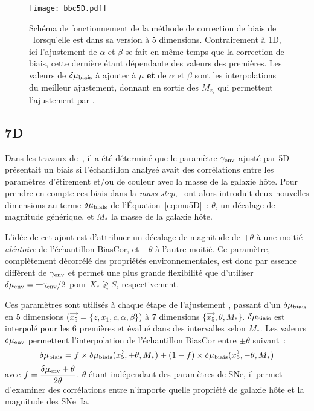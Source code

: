 \documentclass[../main/main.tex]{subfiles}
\begin{document}
\begin{figure}[]
    \centering
    \texttt{[image: bbc5D.pdf]}
    \caption[Schéma de fonctionnement de la méthode de correction de biais de
    \bbc5D]{Schéma de fonctionnement de la méthode de correction de biais de
        \bbc\ lorsqu'elle est dans sa version à 5 dimensions. Contrairement à
        \bbc1D, ici l'ajustement de $\alpha$ et $\beta$ se fait en même temps
        que la correction de biais, cette dernière étant dépendante des valeurs
        des premières. Les valeurs de $\delta\mu_{\rm biais}$ à ajouter à $\mu$
        \textbf{et} de $\alpha$ et $\beta$ sont les interpolations du meilleur
        ajustement, donnant en sortie des $M_{z_i}$ qui permettent l'ajustement
    par \wfit.}
    \label{fig:bbc5d}
\end{figure}

\subsection{\bbc7D}\label{ssec:bbc7D}

Dans les travaux de~\cite{smith2020}, il a été déterminé que le paramètre
$\gamma_{\rm env}$ ajusté par \bbc5D présentait un biais si l'échantillon
analysé avait des corrélations entre les paramètres d'étirement et/ou de couleur
avec la masse de la galaxie hôte. Pour prendre en compte ces biais dans la
\textit{mass step},~\cite{popovic2021a} ont alors introduit deux nouvelles
dimensions au terme $\delta\mu_{\rm biais}$ de l'Équation~\ref{eq:mu5D}~:
$\theta$, un décalage de magnitude générique, et $M_*$ la masse de la galaxie
hôte.

L'idée de cet ajout est d'attribuer un décalage de magnitude de $+\theta$ à une
moitié \textit{aléatoire} de l'échantillon BiasCor, et $-\theta$ à l'autre
moitié. Ce paramètre, complètement décorrélé des propriétés environnementales,
est donc par essence différent de $\gamma_{\rm env}$ et permet une plus grande
flexibilité que d'utiliser $\delta\mu_{\rm env} = \pm\gamma_{\rm env}/2$ pour
$X_* \gtrless S$, respectivement.

Ces paramètres sont utilisés à chaque étape de l'ajustement \bbc, passant d'un
$\delta\mu_{\rm biais}$ en 5 dimensions ($\overrightarrow{x_5} = \{z, x_1, c,
\alpha, \beta\}$) à 7 dimensions $\{\overrightarrow{x_5}, \theta, M_*\}$.
$\delta\mu_{\rm biais}$ est interpolé pour les 6 premières et évalué dans des
intervalles selon $M_*$. Les valeurs $\delta\mu_{\rm env}$ permettent
l'interpolation de l'échantillon BiasCor entre $\pm\theta$ suivant~:
\begin{equation}
    \delta\mu_{\rm biais} =
    f\times\delta\mu_{\rm biais}(\overrightarrow{x_5}, +\theta, M_*)
    + (1-f)\times\delta\mu_{\rm biais}(\overrightarrow{x_5}, -\theta, M_*)
\end{equation}
avec $\displaystyle f = \frac{\delta\mu_{\rm env}+\theta}{2\theta}$. $\theta$ étant
indépendant des paramètres de SNe, il permet d'examiner des corrélations entre
n'importe quelle propriété de galaxie hôte et la magnitude des SNe~Ia.
\end{document}
